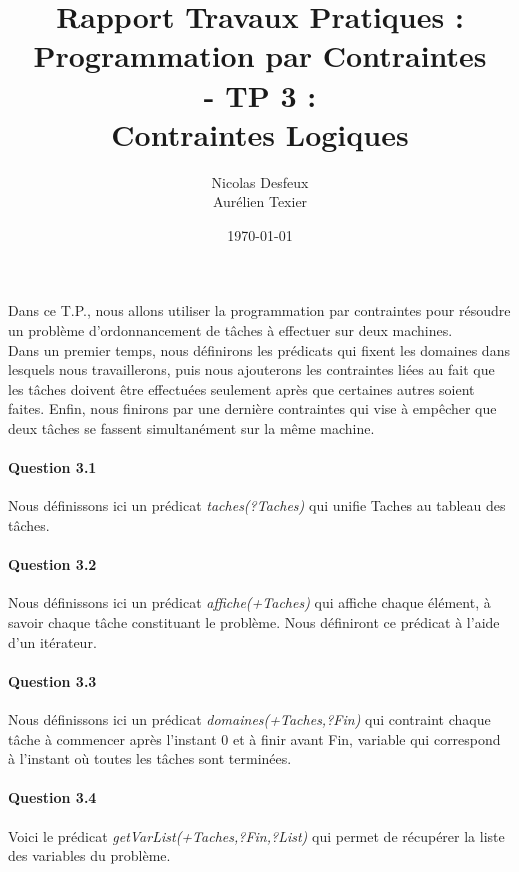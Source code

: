 \documentclass[11pt]{article} %
\date{\today}
\title{Rapport Travaux Pratiques : \\Programmation par Contraintes\\ - TP 3 : \\\textbf{Contraintes Logiques}}
\author{Nicolas Desfeux\\Aurélien Texier}
\begin{document}
\lstset{language=Prolog,breaklines=true,numbers=left,basicstyle=\footnotesize ,numberstyle=\footnotesize}
\maketitle
\paragraph{} Dans ce T.P., nous allons utiliser la programmation par contraintes pour résoudre un problème d'ordonnancement de tâches à effectuer sur deux machines.\\Dans un premier temps, nous définirons les prédicats qui fixent les domaines dans lesquels nous travaillerons, puis nous ajouterons les contraintes liées au fait que les tâches doivent être effectuées seulement après que certaines autres soient faites. Enfin, nous finirons par une dernière contraintes qui vise à empêcher que deux tâches se fassent simultanément sur la même machine.

\paragraph{Question 3.1}
Nous définissons ici un prédicat \textit{taches(?Taches)} qui unifie Taches au tableau des tâches.


\paragraph{Question 3.2}
Nous définissons ici un prédicat \textit{affiche(+Taches)} qui affiche chaque élément, à savoir chaque tâche constituant le problème. Nous définiront ce prédicat à l'aide d'un itérateur.


\paragraph{Question 3.3}
Nous définissons ici un prédicat \textit{domaines(+Taches,?Fin)} qui contraint chaque tâche à commencer après l'instant 0 et à finir avant Fin, variable qui correspond à l'instant où toutes les tâches sont terminées.


\paragraph{Question 3.4}
Voici le prédicat \textit{getVarList(+Taches,?Fin,?List)} qui permet de récupérer la liste des variables du problème.

\end{document}
